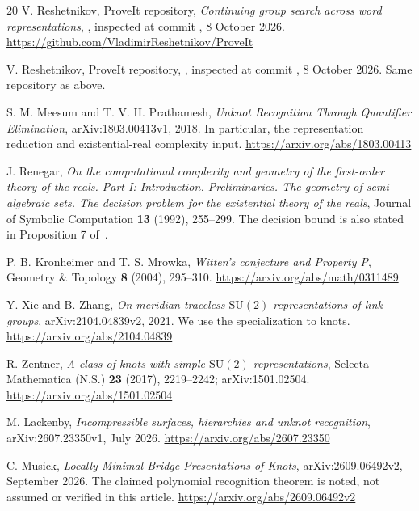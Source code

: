 \documentclass[11pt]{article}
\theoremstyle{definition}
\theoremstyle{remark}
\newcommand{\SU}{\mathrm{SU}(2)}
\begin{document}
\begin{thebibliography}{20}
V. Reshetnikov, ProveIt repository, \emph{Continuing group search across word representations}, , inspected at commit \texttt{}, 8 October 2026.\newline
\url{https://github.com/VladimirReshetnikov/ProveIt}

V. Reshetnikov, ProveIt repository, , inspected at commit \texttt{}, 8 October 2026. Same repository as above.

S. M. Meesum and T. V. H. Prathamesh, \emph{Unknot Recognition Through Quantifier Elimination}, arXiv:1803.00413v1, 2018. In particular, the representation reduction and existential-real complexity input.\newline
\url{https://arxiv.org/abs/1803.00413}

J. Renegar, \emph{On the computational complexity and geometry of the first-order theory of the reals. Part I: Introduction. Preliminaries. The geometry of semi-algebraic sets. The decision problem for the existential theory of the reals}, Journal of Symbolic Computation \textbf{13} (1992), 255--299. The decision bound is also stated in Proposition 7 of~\cite{meesum}.

P. B. Kronheimer and T. S. Mrowka, \emph{Witten's conjecture and Property P}, Geometry \& Topology \textbf{8} (2004), 295--310.\newline
\url{https://arxiv.org/abs/math/0311489}

Y. Xie and B. Zhang, \emph{On meridian-traceless $\SU$-representations of link groups}, arXiv:2104.04839v2, 2021. We use the specialization to knots.\newline
\url{https://arxiv.org/abs/2104.04839}

R. Zentner, \emph{A class of knots with simple $\SU$ representations}, Selecta Mathematica (N.S.) \textbf{23} (2017), 2219--2242; arXiv:1501.02504.\newline
\url{https://arxiv.org/abs/1501.02504}

M. Lackenby, \emph{Incompressible surfaces, hierarchies and unknot recognition}, arXiv:2607.23350v1, July 2026.\newline
\url{https://arxiv.org/abs/2607.23350}

C. Musick, \emph{Locally Minimal Bridge Presentations of Knots}, arXiv:2609.06492v2, September 2026. The claimed polynomial recognition theorem is noted, not assumed or verified in this article.\newline
\url{https://arxiv.org/abs/2609.06492v2}
\end{thebibliography}
\end{document}
